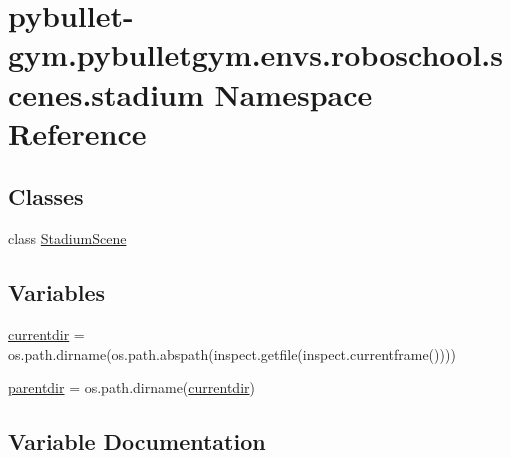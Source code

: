 \hypertarget{namespacepybullet-gym_1_1pybulletgym_1_1envs_1_1roboschool_1_1scenes_1_1stadium}{}\section{pybullet-\/gym.pybulletgym.\+envs.\+roboschool.\+scenes.\+stadium Namespace Reference}
\label{namespacepybullet-gym_1_1pybulletgym_1_1envs_1_1roboschool_1_1scenes_1_1stadium}
\subsection*{Classes}
\begin{DoxyCompactItemize}
\item 
class \hyperlink{classpybullet-gym_1_1pybulletgym_1_1envs_1_1roboschool_1_1scenes_1_1stadium_1_1_stadium_scene}{Stadium\+Scene}
\end{DoxyCompactItemize}
\subsection*{Variables}
\begin{DoxyCompactItemize}
\item 
\hyperlink{namespacepybullet-gym_1_1pybulletgym_1_1envs_1_1roboschool_1_1scenes_1_1stadium_acc26a7ae6c65fd583d68323e6a322b9b}{currentdir} = os.\+path.\+dirname(os.\+path.\+abspath(inspect.\+getfile(inspect.\+currentframe())))
\item 
\hyperlink{namespacepybullet-gym_1_1pybulletgym_1_1envs_1_1roboschool_1_1scenes_1_1stadium_aa678ae0501de3715ff91c05f577d08e0}{parentdir} = os.\+path.\+dirname(\hyperlink{namespacepybullet-gym_1_1pybulletgym_1_1envs_1_1roboschool_1_1scenes_1_1stadium_acc26a7ae6c65fd583d68323e6a322b9b}{currentdir})
\end{DoxyCompactItemize}


\subsection{Variable Documentation}
